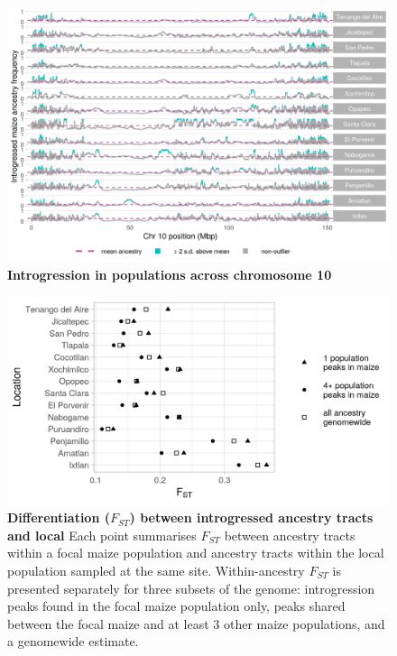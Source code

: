 \begin{figure}[ht]
\includegraphics[width=.85\textwidth]{chapter2/figures/mexicana_shared_outliers_chr_10.png}
\caption{\color{Gray} \textbf{Introgression in \mexicana populations across chromosome 10}}
\label{mexicana_chr10}
\end{figure}

\begin{figure}[ht]
\includegraphics[width=\textwidth]{chapter2/figures/local_fst_within_mexicana_ancestry_peaks.png}
\caption{\color{Gray} \textbf{Differentiation ($F_{ST}$) between introgressed ancestry tracts and local \mexicana} Each point summarises $F_{ST}$ between \mexicana ancestry tracts within a focal maize population and \mexicana ancestry tracts within the local \mexicana population sampled at the same site. Within-\mexicana ancestry $F_{ST}$ is presented separately for three subsets of the genome: introgression peaks found in the focal maize population only, peaks shared between the focal maize and at least 3 other maize populations, and a genomewide estimate.}
\label{local_fst_peaks}
\end{figure}

